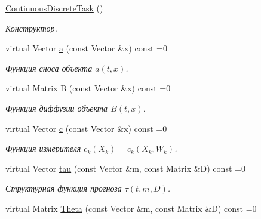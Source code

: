 \begin{DoxyCompactItemize}
\item 
\hypertarget{class_core_1_1_continuous_discrete_task_a56d51edff4050c662197a16df126ca14}{}\label{class_core_1_1_continuous_discrete_task_a56d51edff4050c662197a16df126ca14} 
\hyperlink{class_core_1_1_continuous_discrete_task_a56d51edff4050c662197a16df126ca14}{Continuous\+Discrete\+Task} ()
\begin{DoxyCompactList}\small\item\em Конструктор. \end{DoxyCompactList}\item 
\hypertarget{class_core_1_1_continuous_discrete_task_a478f440555e63f6b14090637a6df46d9}{}\label{class_core_1_1_continuous_discrete_task_a478f440555e63f6b14090637a6df46d9} 
virtual Vector \hyperlink{class_core_1_1_continuous_discrete_task_a478f440555e63f6b14090637a6df46d9}{a} (const Vector \&x) const =0
\begin{DoxyCompactList}\small\item\em Функция сноса объекта $a(t,x)$. \end{DoxyCompactList}\item 
\hypertarget{class_core_1_1_continuous_discrete_task_acdecff4711bae9decda2931343929fae}{}\label{class_core_1_1_continuous_discrete_task_acdecff4711bae9decda2931343929fae} 
virtual Matrix \hyperlink{class_core_1_1_continuous_discrete_task_acdecff4711bae9decda2931343929fae}{B} (const Vector \&x) const =0
\begin{DoxyCompactList}\small\item\em Функция диффузии объекта $B(t,x)$. \end{DoxyCompactList}\item 
virtual Vector \hyperlink{class_core_1_1_continuous_discrete_task_a64ea27bc1e2a9e6bf1401fc7622c9aea}{c} (const Vector \&x) const =0
\begin{DoxyCompactList}\small\item\em Функция измерителя $c_k(X_k) = c_k(X_k, W_k)$. \end{DoxyCompactList}\item 
virtual Vector \hyperlink{class_core_1_1_continuous_discrete_task_a491a9dc4463031a6f5f2eeda24d8ba9c}{tau} (const Vector \&m, const Matrix \&D) const =0
\begin{DoxyCompactList}\small\item\em Структурная функция прогноза $\tau(t, m, D)$. \end{DoxyCompactList}\item 
virtual Matrix \hyperlink{class_core_1_1_continuous_discrete_task_a961cc49fd0c72ba0a211bb4913ca3ece}{Theta} (const Vector \&m, const Matrix \&D) const =0

\end{DoxyCompactItemize}
